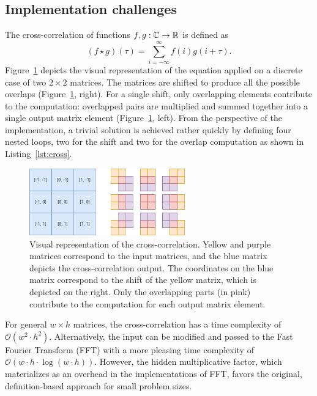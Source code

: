 \subsection{Implementation challenges}

The cross-correlation of functions $f, g: \mathbb{C}\rightarrow \mathbb{R}$ is defined as
\begin{equation}
    (f \star g)(\tau) = \sum_{i=-\infty}^{\infty} f(i) g(i+\tau).
\end{equation}
Figure~\ref{fig:cross-correlation} depicts the visual representation of the equation applied on a discrete case of two $2\times 2$ matrices. The matrices are shifted to produce all the possible overlaps (Figure~\ref{fig:cross-correlation}, right). For a single shift, only overlapping elements contribute to the computation: overlapped pairs are multiplied and summed together into a single output matrix element (Figure~\ref{fig:cross-correlation}, left). From the perspective of the implementation, a trivial solution is achieved rather quickly by defining four nested loops, two for the shift and two for the overlap computation as shown in Listing~\ref{lst:cross}.

\begin{figure}
    \centering
    \includegraphics[width=0.6\textwidth]{img/cc.png}
    \caption{Visual representation of the cross-correlation. Yellow and purple matrices correspond to the input matrices, and the blue matrix depicts the cross-correlation output. The coordinates on the blue matrix correspond to the shift of the yellow matrix, which is depicted on the right. Only the overlapping parts (in pink) contribute to the computation for each output matrix element.}
    \label{fig:cross-correlation}
\end{figure}

For general $w \times h$ matrices, the cross-correlation has a time complexity of $\mathcal{O}(w^2 \cdot h^2)$. Alternatively, the input can be modified and passed to the Fast Fourier Transform (FFT) with a more pleasing time complexity of $\mathcal{O}(w\cdot h \cdot \log(w\cdot h))$. However, the hidden multiplicative factor, which materializes as an overhead in the implementations of FFT, favors the original, definition-based approach for small problem sizes.

